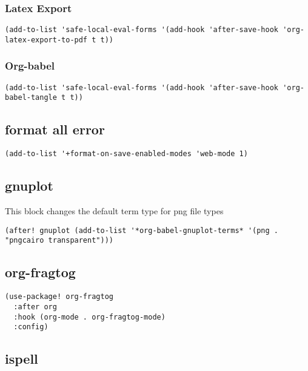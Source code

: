 \documentclass[11pt]{article}
\begin{document}
\subsubsection{Latex Export}
\label{sec:org54675d7}
\begin{verbatim}
(add-to-list 'safe-local-eval-forms '(add-hook 'after-save-hook 'org-latex-export-to-pdf t t))
\end{verbatim}
\subsubsection{Org-babel}
\label{sec:orgb134dae}
\begin{verbatim}
(add-to-list 'safe-local-eval-forms '(add-hook 'after-save-hook 'org-babel-tangle t t))
\end{verbatim}
\subsection{format all error}
\label{sec:org5dc21ac}
\begin{verbatim}
(add-to-list '+format-on-save-enabled-modes 'web-mode 1)
\end{verbatim}
\subsection{gnuplot}
\label{sec:orgdd1c147}
This block changes the default term type for png file types
\begin{verbatim}
(after! gnuplot (add-to-list '*org-babel-gnuplot-terms* '(png . "pngcairo transparent")))
\end{verbatim}
\subsection{org-fragtog}
\label{sec:org3379e52}
\begin{verbatim}
(use-package! org-fragtog
  :after org
  :hook (org-mode . org-fragtog-mode)
  :config)
\end{verbatim}
\subsection{ispell}
\label{sec:orgf2561db}
\end{document}
